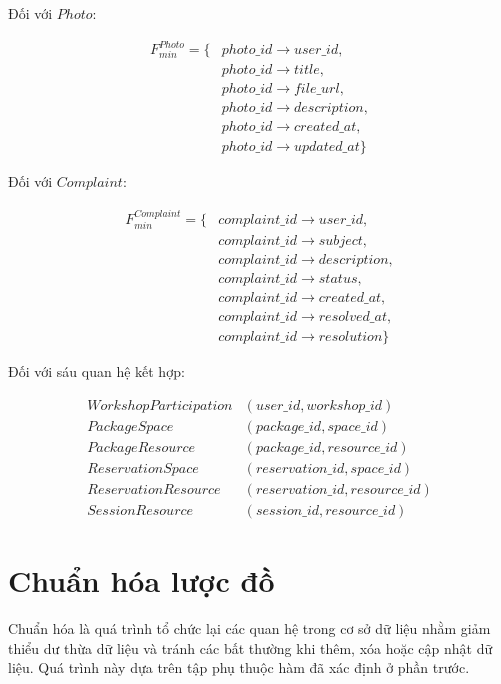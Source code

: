 Đối với $Photo$:

\[
\begin{aligned}
	F_{min}^{Photo}=\{&
	photo\_id\rightarrow user\_id,\\
	&photo\_id\rightarrow title,\\
	&photo\_id\rightarrow file\_url,\\
	&photo\_id\rightarrow description,\\
	&photo\_id\rightarrow created\_at,\\
	&photo\_id\rightarrow updated\_at
	\}
\end{aligned}
\]

Đối với $Complaint$:

\[
\begin{aligned}
	F_{min}^{Complaint}=\{&
	complaint\_id\rightarrow user\_id,\\
	&complaint\_id\rightarrow subject,\\
	&complaint\_id\rightarrow description,\\
	&complaint\_id\rightarrow status,\\
	&complaint\_id\rightarrow created\_at,\\
	&complaint\_id\rightarrow resolved\_at,\\
	&complaint\_id\rightarrow resolution
	\}
\end{aligned}
\]

Đối với sáu quan hệ kết hợp:

\[
\begin{aligned}
	WorkshopParticipation
	&(user\_id,workshop\_id)\\
	PackageSpace
	&(package\_id,space\_id)\\
	PackageResource
	&(package\_id,resource\_id)\\
	ReservationSpace
	&(reservation\_id,space\_id)\\
	ReservationResource
	&(reservation\_id,resource\_id)\\
	SessionResource
	&(session\_id,resource\_id)
\end{aligned}
\]



\section{Chuẩn hóa lược đồ}

Chuẩn hóa là quá trình tổ chức lại các quan hệ trong cơ sở dữ liệu nhằm giảm thiểu dư thừa dữ liệu và tránh các bất thường khi thêm, xóa hoặc cập nhật dữ liệu. Quá trình này dựa trên tập phụ thuộc hàm đã xác định ở phần trước.

